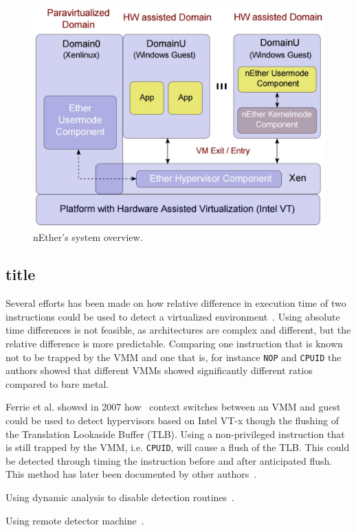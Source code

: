 \begin{figure}[!h]
	\centering
	\includegraphics[width=\linewidth]{figure/nether.png}
	\caption{nEther's system overview.}
	\label{fig:nether}
\end{figure}

\subsection{title}


Several efforts has been made on how relative difference in execution time of
two instructions could be used to detect a virtualized
environment~\cite{raffetseder2007, thompson}. Using absolute time differences is
not feasible, as architectures are complex and different, but the relative
difference is more predictable. Comparing one instruction that is known not to
be trapped by the VMM and one that is, for instance {\tt NOP} and {\tt CPUID}
the authors showed that different VMMs showed significantly different ratios
compared to bare metal.

Ferrie {et al.} showed in 2007 how~\cite{ferrie2007} context switches between an
VMM and guest could be used to detect hypervisors based on Intel VT-x though the
flushing of the Translation Lookaside Buffer (TLB). Using a non-privileged
instruction that is still trapped by the VMM, i.e. {\tt CPUID}, will cause a
flush of the TLB. This could be detected through timing the instruction before
and after anticipated flush. This method has later been documented by other
authors~\cite{thompson}.

Using dynamic analysis to disable detection routines~\cite{kang2009}.

Using remote detector machine~\cite{franklin2008}.

